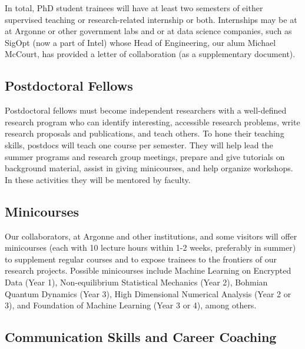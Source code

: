 \documentclass[11pt]{NSFamsart}
\begin{document}
In total, PhD student trainees will have at least two semesters of either supervised teaching or research-related internship or both.  Internships may be at at Argonne or other government labs and or at data science companies, such as SigOpt (now a part of Intel) whose Head of Engineering, our alum Michael McCourt, has provided a letter  of collaboration (as a supplementary document).

\subsection*{Postdoctoral Fellows}
Postdoctoral fellows must become independent researchers with a well-defined research program who can identify interesting, accessible research problems, write research proposals and publications, and teach others.  To hone their teaching skills, postdocs will teach one course per semester. They will help lead the summer programs and research group meetings, prepare and give tutorials on background material, assist in giving minicourses, and help organize workshops.  In these activities they will be mentored by faculty.

\subsection*{Minicourses}
Our collaborators, at Argonne and other institutions, and some visitors will offer minicourses (each with 10 lecture hours within 1-2 weeks, preferably in summer) to supplement regular courses and to expose trainees to the frontiers of our research projects. Possible minicourses include  Machine Learning on Encrypted Data (Year 1),  Non-equilibrium Statistical Mechanics (Year 2),   Bohmian Quantum Dynamics (Year 3), High Dimensional Numerical Analysis (Year 2 or 3), and Foundation of Machine Learning (Year 3 or 4), among others. 

\subsection{Communication Skills and Career Coaching}
\end{document}
